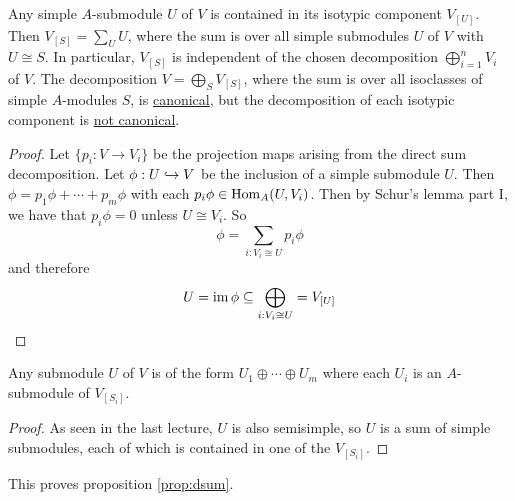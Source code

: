 \begin{thm}
	Any simple $A$-submodule $U$ of $V$ is contained in its isotypic component $V_{[U]}$.
	Then $V_{[S]} = \sum_U U$, where the sum is over all simple submodules $U$ of $V$ with $U \cong S$.
	In particular, $V_{[S]}$ is independent of the chosen decomposition $\bigoplus_{i=1}^n V_i$ of $V$.
	The decomposition $V = \bigoplus_S V_{[S]}$, where the sum is over all isoclasses of simple $A$-modules $S$, is \underline{canonical}, but the decomposition of each isotypic component is \underline{not canonical}.
\end{thm}

\begin{proof}
	Let $\{p_i: V \to V_i\}$ be the projection maps arising from the direct sum decomposition.
	Let $\phi: U \hookrightarrow V$ be the inclusion of a simple submodule $U$.
	Then $\phi = p_1\phi + \cdots + p_m\phi$ with each $p_i\phi \in \operatorname{Hom}_A(U,V_i)$.
	Then by Schur's lemma part I, we have that $p_i\phi=0$ unless $U \cong V_i$.
	So
	\[\phi = \sum_{i: V_i \cong U} p_i\phi\]
	and therefore
	\[U = \operatorname{im}\phi \subseteq \bigoplus_{i: V_i \cong U} = V_{[U]} \qedhere\]
\end{proof}

\begin{cor}
	Any submodule $U$ of $V$ is of the form $U_1 \oplus \cdots \oplus U_m$ where each $U_i$ is an $A$-submodule of $V_{[S_i]}$.
\end{cor}

\begin{proof}
	As seen in the last lecture, $U$ is also semisimple, so $U$ is a sum of simple submodules, each of which is contained in one of the $V_{[S_i]}$.
\end{proof}

\begin{rmk}
	This proves proposition \ref{prop:dsum}.
\end{rmk}
